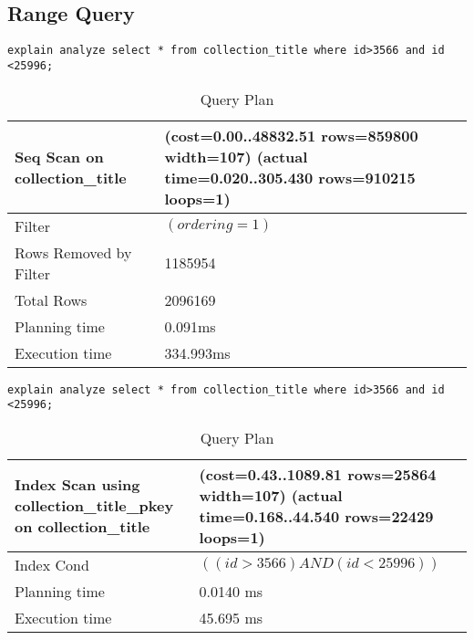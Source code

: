\documentclass[paper=letter, fontsize=12pt]{article}
\begin{document}
\subsection{Range Query}
\begin{verbatim}
explain analyze select * from collection_title where id>3566 and id <25996;
\end{verbatim}

\begin{longtable}{p{4cm} | p{12cm}}
	\caption{Query Plan}
	\\
	Seq Scan on collection\_title & (cost=0.00..48832.51 rows=859800 width=107) (actual time=0.020..305.430 rows=910215 loops=1)
	\\ \hline
	Filter & $(ordering = 1)$
	\\ \hline
	Rows Removed by Filter & 1185954
	\\ \hline
	Total Rows & 2096169
	\\ \hline
	Planning time & 0.091ms
	\\ \hline
	Execution time & 334.993ms
\end{longtable}


\begin{verbatim}
explain analyze select * from collection_title where id>3566 and id <25996;
\end{verbatim}

\begin{longtable}{p{4cm} | p{12cm}}
	\caption{Query Plan}
	\\
	Index Scan using collection\_title\_pkey on collection\_title & (cost=0.43..1089.81 rows=25864 width=107) (actual time=0.168..44.540 rows=22429 loops=1)
	\\ \hline
	Index Cond & $((id > 3566) AND (id < 25996))$
	\\ \hline
	Planning time & 0.0140 ms
	\\ \hline
	Execution time & 45.695 ms
\end{longtable}






\end{document}
